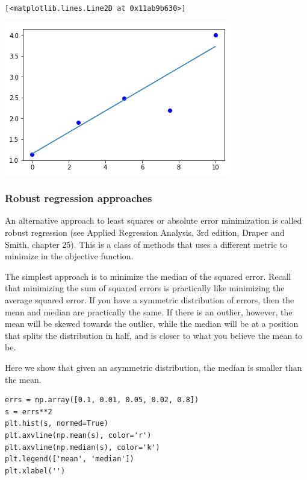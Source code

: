 \documentclass[11pt]{article}
\begin{document}
\begin{verbatim}
[<matplotlib.lines.Line2D at 0x11ab9b630>]
\end{verbatim}



\begin{center}
\includegraphics[width=.9\linewidth]{obipy-resources/37c51028cef42d76546d882661b04271-20264ZIt.png}
\end{center}


\subsubsection{Robust regression approaches}
\label{sec:org3db24d4}

An alternative approach to least squares or absolute error minimization is called robust regression (see Applied Regression Analysis, 3rd edition, Draper and Smith, chapter 25). This is a class of methods that uses a different metric to minimize in the objective function.

The simplest approach is to minimize the median of the squared error. Recall that minimizing the sum of squared errors is practically like minimizing the average squared error. If you have a symmetric distribution of errors, then the mean and median are practically the same. If there is an outlier, however, the mean will be skewed towards the outlier, while the median will be at a position that splits the distribution in half, and is closer to what you believe the mean to be.

Here we show that given an asymmetric distribution, the median is smaller than the mean.

\begin{verbatim}
errs = np.array([0.1, 0.01, 0.05, 0.02, 0.8])
s = errs**2
plt.hist(s, normed=True)
plt.axvline(np.mean(s), color='r')
plt.axvline(np.median(s), color='k')
plt.legend(['mean', 'median'])
plt.xlabel('')
\end{verbatim}
\end{document}
